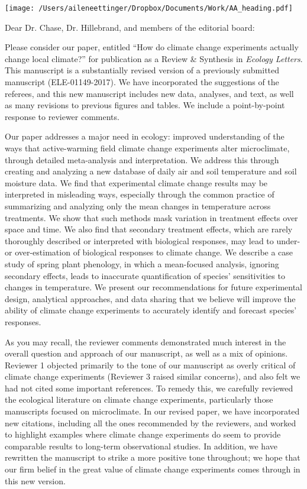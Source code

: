 \documentclass[11pt,a4paper]{letter}
\begin{document}


\begin{letter}{}
\texttt{[image: /Users/aileneettinger/Dropbox/Documents/Work/AA\_heading.pdf]}

\opening{Dear Dr. Chase, Dr. Hillebrand, and members of the editorial board:}
Please consider our paper, entitled ``How do climate change experiments actually change local climate?'' for publication as a Review \& Synthesis in \emph{Ecology Letters}. This manuscript is a substantially revised version of a previously submitted manuscript  (ELE-01149-2017). We have incorporated the suggestions of the referees, and this new manuscript includes new data, analyses, and text, as well as many revisions to previous figures and tables. We include a point-by-point response to reviewer comments.

Our paper addresses a major need in ecology: improved understanding of the ways that active-warming field climate change experiments alter microclimate, through detailed meta-analysis and interpretation. We address this through creating and analyzing a new database of daily air and soil temperature and soil moisture data.  We find that experimental climate change results may be interpreted in misleading ways, especially through the common practice of summarizing and analyzing only the mean changes in temperature across treatments.  We show that such methods mask variation in treatment effects over space and time. We also find that secondary treatment effects, which are rarely thoroughly described or interpreted with biological responses, may lead to under- or over-estimation of biological responses to climate change. We describe a case study of spring plant phenology, in which a mean-focused analysis, ignoring secondary effects, leads to inaccurate quantification of species' sensitivities to changes in temperature. We present our recommendations for future experimental design, analytical approaches, and data sharing that we believe will improve the ability of climate change experiments to accurately identify and forecast species' responses.

As you may recall, the reviewer comments demonstrated much interest in the overall question and approach of our manuscript, as well as a mix of opinions.  Reviewer 1 objected primarily to the tone of our manuscript as overly critical of climate change experiments (Reviewer 3 raised similar concerns), and also felt we had not cited some important references. To remedy this, we carefully reviewed the ecological literature on climate change experiments, particularly those manuscripts focused on microclimate. In our revised paper, we have incorporated new citations, including all the ones recommended by the reviewers, and worked to highlight examples where climate change experiments do seem to provide comparable results to long-term observational studies. In addition, we have rewritten the manuscript to strike a more positive tone throughout; we hope that our firm belief in the great value of climate change experiments comes through in this new version.


\end{letter}
\end{document}
